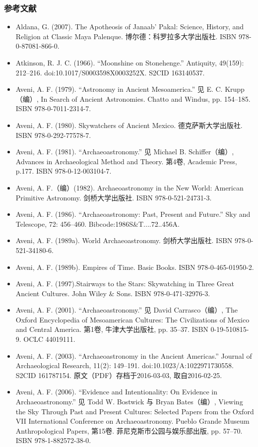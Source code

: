 \subsubsection{参考文献}
\begin{itemize}
    \item Aldana, G. (2007). The Apotheosis of Janaab' Pakal: Science, History, and Religion at Classic Maya Palenque. 博尔德：科罗拉多大学出版社. ISBN 978-0-87081-866-0.
    \item Atkinson, R. J. C. (1966). “Moonshine on Stonehenge.” Antiquity, 49(159): 212–216. doi:10.1017/S0003598X0003252X. S2CID 163140537.
    \item Aveni, A. F. (1979). “Astronomy in Ancient Mesoamerica.” 见 E. C. Krupp（编）, In Search of Ancient Astronomies. Chatto and Windus, pp. 154–185. ISBN 978-0-7011-2314-7.
    \item Aveni, A. F. (1980). Skywatchers of Ancient Mexico. 德克萨斯大学出版社. ISBN 978-0-292-77578-7.
    \item Aveni, A. F. (1981). “Archaeoastronomy.” 见 Michael B. Schiffer（编）, Advances in Archaeological Method and Theory. 第4卷, Academic Press, p.177. ISBN 978-0-12-003104-7.
    \item Aveni, A. F.（编）(1982). Archaeoastronomy in the New World: American Primitive Astronomy. 剑桥大学出版社. ISBN 978-0-521-24731-3.
    \item Aveni, A. F. (1986). “Archaeoastronomy: Past, Present and Future.” Sky and Telescope, 72: 456–460. Bibcode:1986S\&T....72..456A.
    \item Aveni, A. F. (1989a). World Archaeoastronomy. 剑桥大学出版社. ISBN 978-0-521-34180-6.
    \item Aveni, A. F. (1989b). Empires of Time. Basic Books. ISBN 978-0-465-01950-2.
    \item Aveni, A. F. (1997).Stairways to the Stars: Skywatching in Three Great Ancient Cultures. John Wiley \& Sons. ISBN 978-0-471-32976-3.
    \item Aveni, A. F. (2001). “Archaeoastronomy.” 见 David Carrasco（编）, The Oxford Encyclopedia of Mesoamerican Cultures: The Civilizations of Mexico and Central America. 第1卷, 牛津大学出版社, pp. 35–37. ISBN 0-19-510815-9. OCLC 44019111.
    \item Aveni, A. F. (2003). “Archaeoastronomy in the Ancient Americas.” Journal of Archaeological Research, 11(2): 149–191. doi:10.1023/A:1022971730558. S2CID 161787154. 原文（PDF）存档于2016-03-03, 取自2016-02-25.
    \item Aveni, A. F. (2006). “Evidence and Intentionality: On Evidence in Archaeoastronomy.” 见 Todd W. Bostwick 与 Bryan Bates（编）, Viewing the Sky Through Past and Present Cultures: Selected Papers from the Oxford VII International Conference on Archaeoastronomy. Pueblo Grande Museum Anthropological Papers, 第15卷. 菲尼克斯市公园与娱乐部出版, pp. 57–70. ISBN 978-1-882572-38-0.

\end{itemize}
